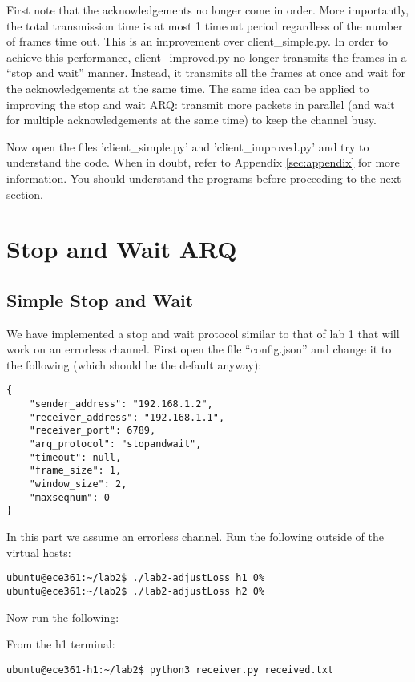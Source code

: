 \documentclass[11pt]{article}
\begin{document}
First note that the acknowledgements no longer come in order. More importantly, the total transmission time is at most 1 timeout period regardless of the number of frames time out. This is an improvement over client\_simple.py. In order to achieve this performance, client\_improved.py no longer transmits the frames in a ``stop and wait'' manner. Instead, it transmits all the frames at once and wait for the acknowledgements at the same time. The same idea can be applied to improving the stop and wait ARQ: transmit more packets in parallel (and wait for multiple acknowledgements at the same time) to keep the channel busy.

Now open the files 'client\_simple.py' and 'client\_improved.py' and try to understand the code. When in doubt, refer to Appendix \ref{sec:appendix} for more information. You should understand the programs before proceeding to the next section.

\section{Stop and Wait ARQ}
\label{sec:example}

\subsection{Simple Stop and Wait}
We have implemented a stop and wait protocol similar to that of lab 1 that will work on an errorless channel. First open the file ``config.json'' and change it to the following (which should be the default anyway):

\begin{lstlisting}[style=ece361-shell-base, caption={Configuration For Small File}]
{
    "sender_address": "192.168.1.2",
    "receiver_address": "192.168.1.1",
    "receiver_port": 6789,
    "arq_protocol": "stopandwait",
    "timeout": null,
    "frame_size": 1,
    "window_size": 2,
    "maxseqnum": 0
}
\end{lstlisting}

In this part we assume an errorless channel. Run the following outside of the virtual hosts:
\begin{lstlisting}[style=ece361shell, caption={Setting packet loss to 0\% in both directions.}]
ubuntu@ece361:~/lab2$ ./lab2-adjustLoss h1 0%
ubuntu@ece361:~/lab2$ ./lab2-adjustLoss h2 0%
\end{lstlisting}


Now run the following:

From the h1 terminal:
\begin{lstlisting}[style=ece361-shell-base, caption={}]
ubuntu@ece361-h1:~/lab2$ python3 receiver.py received.txt
\end{lstlisting}
\end{document}
